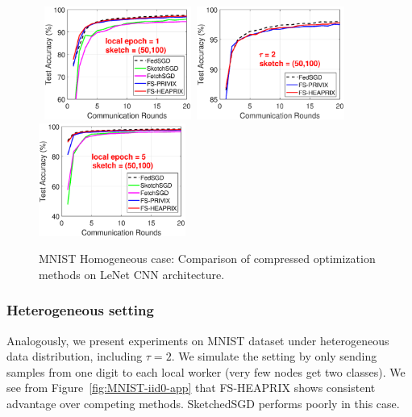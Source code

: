 \documentclass[11pt]{article}
\begin{document}
\begin{figure}[h]
\begin{center}
		\mbox{%
		\includegraphics[width=1.9in]{MNIST_figures/local1_sketch50_iid1_test_acc.eps}%
		\includegraphics[width=1.9in]{MNIST_figures/local2_sketch50_iid1_test_acc.eps} %
		\includegraphics[width=1.9in]{MNIST_figures/local5_sketch50_iid1_test_acc.eps}
		}
	\end{center}
	\caption{MNIST Homogeneous case: Comparison of compressed optimization methods on LeNet CNN architecture.}
    \label{fig:MNIST-iid1-app}
\end{figure}

\subsubsection{Heterogeneous setting}

Analogously, we present experiments on MNIST dataset under heterogeneous data distribution, including $\tau=2$. We simulate the setting by only sending samples from one digit to each local worker (very few nodes get two classes). We see from Figure~\ref{fig:MNIST-iid0-app} that FS-HEAPRIX shows consistent advantage over competing methods. SketchedSGD performs poorly in this case.
\end{document}
